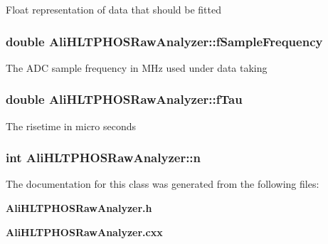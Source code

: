 Float representation of data that should be fitted 
\subsubsection{\setlength{\rightskip}{0pt plus 5cm}double {\bf Ali\-HLTPHOSRaw\-Analyzer::f\-Sample\-Frequency}\hspace{0.3cm}{\tt  [protected]}}\label{classAliHLTPHOSRawAnalyzer_p1}


The ADC sample frequency in MHz used under data taking 
\subsubsection{\setlength{\rightskip}{0pt plus 5cm}double {\bf Ali\-HLTPHOSRaw\-Analyzer::f\-Tau}\hspace{0.3cm}{\tt  [protected]}}\label{classAliHLTPHOSRawAnalyzer_p4}


The risetime in micro seconds 
\subsubsection{\setlength{\rightskip}{0pt plus 5cm}int {\bf Ali\-HLTPHOSRaw\-Analyzer::n}\hspace{0.3cm}{\tt  [protected]}}\label{classAliHLTPHOSRawAnalyzer_p7}




The documentation for this class was generated from the following files:\begin{CompactItemize}
\item 
{\bf Ali\-HLTPHOSRaw\-Analyzer.h}\item 
{\bf Ali\-HLTPHOSRaw\-Analyzer.cxx}\end{CompactItemize}
